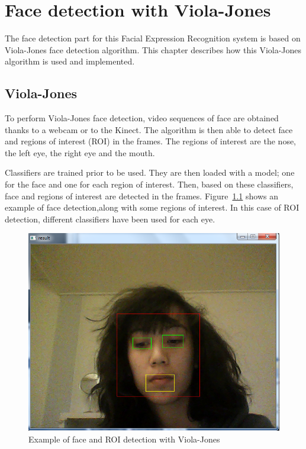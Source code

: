 \chapter{Face detection with Viola-Jones}
\label{chap:implementation_violajones}

\noindent The face detection part for this Facial Expression Recognition system is based on Viola-Jones face detection algorithm. This chapter describes how this Viola-Jones algorithm is used and implemented.
\newline

\section{Viola-Jones}

\vspace{\baselineskip}
\noindent To perform Viola-Jones face detection, video sequences of face are obtained thanks to a webcam or to the Kinect. The algorithm is then able to detect face and regions of interest (ROI) in the frames. The regions of interest are the nose, the left eye, the right eye and the mouth. 
\newline

\noindent Classifiers are trained prior to be used. They are then loaded with a model; one for the face and one for each region of interest. Then, based on these classifiers, face and regions of interest are detected in the frames. Figure~\ref{violajones_implementation_example} shows an example of face detection,along with some regions of interest. In this case of ROI detection, different classifiers have been used for each eye. 
\newline

\begin{figure}[!h]
\begin{center}
\noindent \includegraphics[scale=0.4]{figures/violajones_implementation_example} 
\newline
\caption{Example of face and ROI detection with Viola-Jones}
\label{violajones_implementation_example}
\end{center} 
\end{figure}